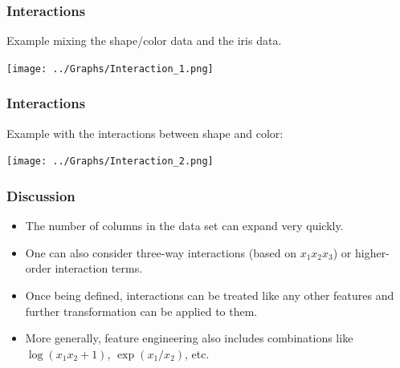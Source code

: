 \begin{frame}
\frametitle{Interactions}
Example mixing the shape/color data and the iris data.
\begin{center}
\texttt{[image: ../Graphs/Interaction\_1.png]}
\end{center}
\end{frame}
\begin{frame}
\frametitle{Interactions}
Example with the interactions between shape and color:
\begin{center}
\texttt{[image: ../Graphs/Interaction\_2.png]}
\end{center}
\end{frame}
\begin{frame}
\frametitle{Discussion}
\begin{itemize}
\item The number of columns in the data set can expand very quickly. 
\item One can also consider three-way interactions (based on $x_1x_2x_3$) or higher-order interaction terms. 
\item Once being defined, interactions can be treated like any other features and further transformation can be applied to them. 
\item More generally, feature engineering also includes combinations like $\log(x_1x_2+1)$, $\exp(x_1/x_2)$, etc.
\end{itemize}
\end{frame}

